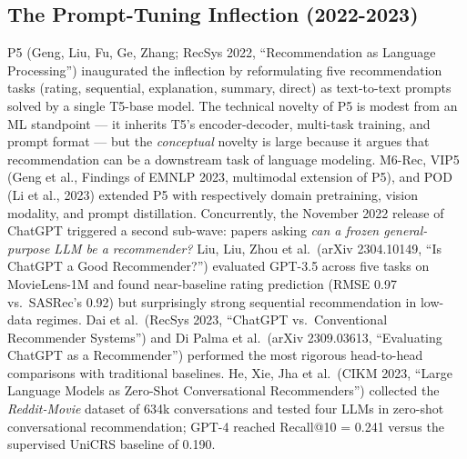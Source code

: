 \subsection{The Prompt-Tuning Inflection (2022-2023)}\label{the-prompt-tuning-inflection-2022-2023}

P5 (Geng, Liu, Fu, Ge, Zhang; RecSys 2022, ``Recommendation as Language Processing'') inaugurated the inflection by reformulating five recommendation tasks (rating, sequential, explanation, summary, direct) as text-to-text prompts solved by a single T5-base model. The technical novelty of P5 is modest from an ML standpoint --- it inherits T5's encoder-decoder, multi-task training, and prompt format --- but the \emph{conceptual} novelty is large because it argues that recommendation can be a downstream task of language modeling. M6-Rec, VIP5 (Geng et al., Findings of EMNLP 2023, multimodal extension of P5), and POD (Li et al., 2023) extended P5 with respectively domain pretraining, vision modality, and prompt distillation. Concurrently, the November 2022 release of ChatGPT triggered a second sub-wave: papers asking \emph{can a frozen general-purpose LLM be a recommender?} Liu, Liu, Zhou et al.~(arXiv 2304.10149, ``Is ChatGPT a Good Recommender?'') evaluated GPT-3.5 across five tasks on MovieLens-1M and found near-baseline rating prediction (RMSE 0.97 vs.~SASRec's 0.92) but surprisingly strong sequential recommendation in low-data regimes. Dai et al.~(RecSys 2023, ``ChatGPT vs.~Conventional Recommender Systems'') and Di Palma et al.~(arXiv 2309.03613, ``Evaluating ChatGPT as a Recommender'') performed the most rigorous head-to-head comparisons with traditional baselines. He, Xie, Jha et al.~(CIKM 2023, ``Large Language Models as Zero-Shot Conversational Recommenders'') collected the \emph{Reddit-Movie} dataset of 634k conversations and tested four LLMs in zero-shot conversational recommendation; GPT-4 reached Recall@10 = 0.241 versus the supervised UniCRS baseline of 0.190.


